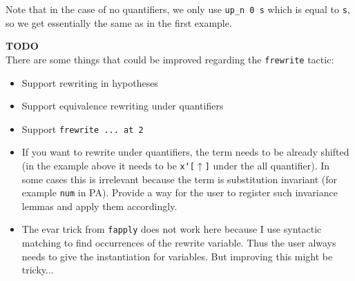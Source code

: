 \documentclass[12pt, a4paper]{article}
\newcommand{\improve}[1]{
	\vspace{3pt}
	\begin{boximprove}
		\parbox{\textwidth}{\textcolor{colorimprove}{\textbf{TODO}\\#1}}
	\end{boximprove}}
\begin{document}
\bigskip\noindent
Note that in the case of no quantifiers, we only use \texttt{up\_n 0 s} which is equal to \texttt{s}, so we get essentially the same as in the first example.

\improve{There are some things that could be improved regarding the \texttt{frewrite} tactic:
\begin{itemize}
	\item Support rewriting in hypotheses
	\item Support equivalence rewriting under quantifiers
	\item Support \texttt{frewrite ... at 2}
	\item If you want to rewrite under quantifiers, the term needs to be already shifted (in the example above it needs to be \texttt{x`[$\uparrow$]} under the all quantifier). In some cases this is irrelevant because the term is substitution invariant (for example \texttt{num} in PA). Provide a way for the user to register such invariance lemmas and apply them accordingly.
	\item The evar trick from \texttt{fapply} does not work here because I use syntactic matching to find occurrences of the rewrite variable. Thus the user always needs to give the instantiation for variables. But improving this might be tricky...
\end{itemize}}
\end{document}
